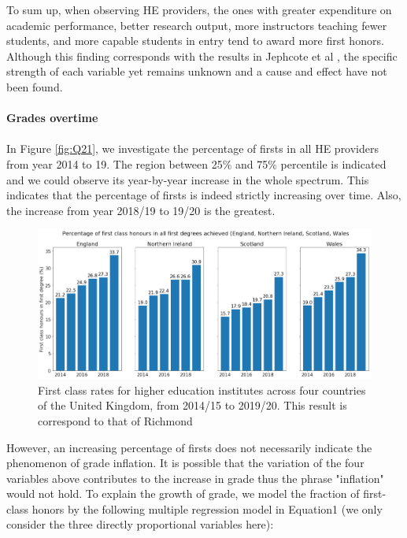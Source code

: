\documentclass[11pt,a4paper]{article}
\begin{document}
To sum up, when observing HE providers, the ones with greater expenditure on academic performance, better research output, more instructors teaching fewer students, and more capable students in entry tend to award more first honors. Although this finding corresponds with the results in Jephcote et al \cite{BayMain}, the specific strength of each variable yet remains unknown and a cause and effect have not been found. 



\paragraph{Grades overtime }  
\paragraph{}

In Figure \ref{fig:Q21}, we investigate the percentage of firsts in all HE providers from year 2014 to 19. The region between 25\% and 75\% percentile is indicated and we could observe its year-by-year increase in the whole spectrum. This indicates that the percentage of firsts is indeed strictly increasing over time. Also, the increase from year 2018/19 to 19/20 is the greatest. 

\begin{figure}[t]
    \centering
    \includegraphics[width=15.24cm]{report/Q31FFF.pdf}
    \caption{First class rates for higher education institutes across four countries of the United Kingdom, from 2014/15 to 2019/20. This result is correspond to that of Richmond \cite{FancyPink}}
    \label{fig:Q31}
\end{figure}

However, an increasing percentage of firsts does not necessarily indicate the phenomenon of grade inflation. It is possible that the variation of the four variables above contributes to the increase in grade thus the phrase "inflation" would not hold. To explain the growth of grade, we model the fraction of first-class honors by the following multiple regression model in Equation1 (we only consider the three directly proportional variables here): 
\end{document}
